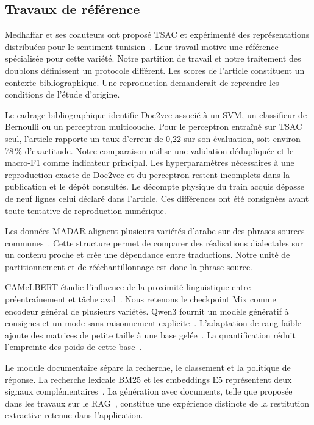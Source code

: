 \subsection{Travaux de référence}
Medhaffar et ses coauteurs ont proposé TSAC et expérimenté des représentations distribuées pour le sentiment tunisien~\cite{tsac}. Leur travail motive une référence spécialisée pour cette variété. Notre partition de travail et notre traitement des doublons définissent un protocole différent. Les scores de l’article constituent un contexte bibliographique. Une reproduction demanderait de reprendre les conditions de l’étude d’origine.

Le cadrage bibliographique identifie Doc2vec associé à un SVM, un classifieur de Bernoulli ou un perceptron multicouche. Pour le perceptron entraîné sur TSAC seul, l’article rapporte un taux d’erreur de 0,22 sur son évaluation, soit environ 78\,\% d’exactitude. Notre comparaison utilise une validation dédupliquée et le macro-F1 comme indicateur principal. Les hyperparamètres nécessaires à une reproduction exacte de Doc2vec et du perceptron restent incomplets dans la publication et le dépôt consultés. Le décompte physique du train acquis dépasse de neuf lignes celui déclaré dans l’article. Ces différences ont été consignées avant toute tentative de reproduction numérique.

Les données MADAR alignent plusieurs variétés d’arabe sur des phrases sources communes~\cite{madar}. Cette structure permet de comparer des réalisations dialectales sur un contenu proche et crée une dépendance entre traductions. Notre unité de partitionnement et de rééchantillonnage est donc la phrase source.

CAMeLBERT étudie l’influence de la proximité linguistique entre préentraînement et tâche aval~\cite{camelbert}. Nous retenons le checkpoint Mix comme encodeur général de plusieurs variétés. Qwen3 fournit un modèle génératif à consignes et un mode sans raisonnement explicite~\cite{qwen3}. L’adaptation de rang faible ajoute des matrices de petite taille à une base gelée~\cite{lora}. La quantification réduit l’empreinte des poids de cette base~\cite{qlora}.

Le module documentaire sépare la recherche, le classement et la politique de réponse. La recherche lexicale BM25 et les embeddings E5 représentent deux signaux complémentaires~\cite{bm25,e5}. La génération avec documents, telle que proposée dans les travaux sur le RAG~\cite{rag}, constitue une expérience distincte de la restitution extractive retenue dans l’application.
